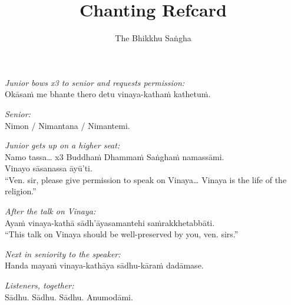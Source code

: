 \documentclass[10pt,oneside]{memoir}
\title{Chanting Refcard}
\author{The Bhikkhu Saṅgha}
\begin{document}
\begin{hangparas}{1em}{1}

\emph{Junior bows x3 to senior and requests permission:}\\
Okāsaṁ me bhante thero detu vinaya-kathaṁ kathetuṁ.

\emph{Senior:}\\
Nimon / Nimantana / Nimantemi.

\emph{Junior gets up on a higher seat:}\\
Namo tassa\ldots{} x3 Buddhaṁ Dhammaṁ Saṅghaṁ namassāmi.\\
Vinayo sāsanassa āyū'ti.\\[5pt]
``Ven. sir, please give permission to speak on Vinaya\ldots{} Vinaya is the
life of the religion.''

\emph{After the talk on Vinaya:}\\
Ayaṁ vinaya-kathā sādh'āyasamantehi saṁrakkhetabbāti.\\[5pt]
``This talk on Vinaya should be well-preserved by you, ven. sirs.''

\emph{Next in seniority to the speaker:}\\
Handa mayaṁ vinaya-kathāya sādhu-kāraṁ dadāmase.

\emph{Listeners, together:}\\
Sādhu. Sādhu. Sādhu. Anumodāmi.

\end{hangparas}
\end{document}
